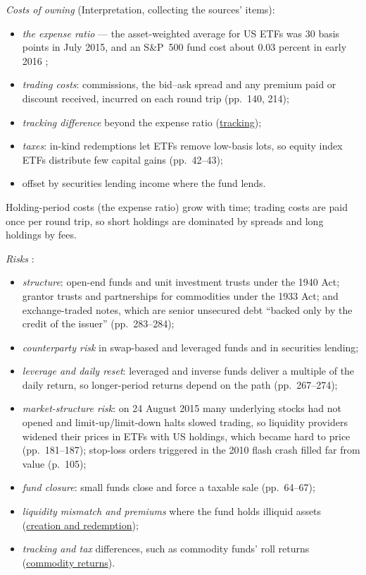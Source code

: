 \begin{qfmethod}\label{meth:etf-costs-risks-uses}
 \emph{Costs of owning} (Interpretation, collecting the sources' items):
\begin{itemize}
\item \emph{the expense ratio} --- the asset-weighted average for US ETFs was 30 basis points in July 2015, and an S\&P~500 fund cost about 0.03 percent in early 2016 \citep[p.~30]{abner-etf-handbook-2016};
\item \emph{trading costs}: commissions, the bid--ask spread and any premium paid or discount received, incurred on each round trip (pp.~140, 214);
\item \emph{tracking difference} beyond the expense ratio (\hyperref[meth:etf-trading-tracking-premiums]{tracking});
\item \emph{taxes}: in-kind redemptions let ETFs remove low-basis lots, so equity index ETFs distribute few capital gains (pp.~42--43);
\item offset by securities lending income where the fund lends.
\end{itemize}
Holding-period costs (the expense ratio) grow with time; trading costs are paid once per round trip, so short holdings are dominated by spreads and long holdings by fees.

\emph{Risks} \citep[pp.~42, 64--67, 105, 181--187, 266--284]{abner-etf-handbook-2016}:
\begin{itemize}
\item \emph{structure}: open-end funds and unit investment trusts under the 1940 Act; grantor trusts and partnerships for commodities under the 1933 Act; and exchange-traded notes, which are senior unsecured debt ``backed only by the credit of the issuer'' (pp.~283--284);
\item \emph{counterparty risk} in swap-based and leveraged funds and in securities lending;
\item \emph{leverage and daily reset}: leveraged and inverse funds deliver a multiple of the daily return, so longer-period returns depend on the path (pp.~267--274);
\item \emph{market-structure risk}: on 24 August 2015 many underlying stocks had not opened and limit-up/limit-down halts slowed trading, so liquidity providers widened their prices in ETFs with US holdings, which became hard to price (pp.~181--187); stop-loss orders triggered in the 2010 flash crash filled far from value (p.~105);
\item \emph{fund closure}: small funds close and force a taxable sale (pp.~64--67);
\item \emph{liquidity mismatch and premiums} where the fund holds illiquid assets (\hyperref[mech:etf-creation-redemption]{creation and redemption});
\item \emph{tracking and tax} differences, such as commodity funds' roll returns (\hyperref[meth:commodity-futures-return-components]{commodity returns}).
\end{itemize}


\end{qfmethod}
